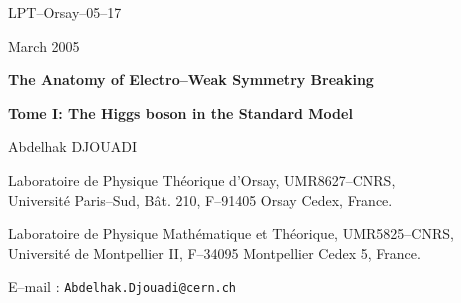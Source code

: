 \documentclass[12pt]{article}
\def\red{\color{Red}}
\def\blue{\color{Blue}}
\begin{document}
\newcommand{\lsim}{\raisebox{-0.13cm}{~\shortstack{$<$ \\[-0.07cm] $\sim$}}~}
\newcommand{\gsim}{\raisebox{-0.13cm}{~\shortstack{$>$ \\[-0.07cm] $\sim$}}~}
\newcommand{\dx}{\mbox{\rm d}}
\newcommand{\ra}{\rightarrow}
\newcommand{\lra}{\longrightarrow}
\newcommand{\ee}{e^+e^-}
\newcommand{\gam}{\gamma \gamma}
\newcommand{\tb}{\tan \beta}
\newcommand{\s}{\smallskip}
\newcommand{\nn}{\noindent}
\newcommand{\non}{\nonumber}
\newcommand{\beq}{\begin{eqnarray}}
\newcommand{\eeq}{\end{eqnarray}}
\newcommand{\pslash}{\not\hspace*{-1.6mm}p}
\newcommand{\kslash}{\not\hspace*{-1.6mm}k}
\newcommand{\lslash}{\not\hspace*{-1.6mm}l}
\newcommand{\eslash}{\hspace*{-1.4mm}\not\hspace*{-1.6mm}E}
\newcommand{\bb}{\blue{\large $\bullet$}}
\newcommand{\rb}{\red{\large $\bullet$}}
\newcommand{\bH}{\blue{$H$}}
\newcommand{\ib}{{\it ibid.\ }}
%
\baselineskip=17pt
\thispagestyle{empty}

\hfill LPT--Orsay--05--17

\hfill March 2005

\vspace*{.5cm}

\begin{center}


{\sc\Large\bf The Anatomy of Electro--Weak Symmetry Breaking}

\vspace{0.5cm}

{\large\sc\bf Tome I: The Higgs boson in the Standard Model}

\vspace{0.7cm}

{\sc\large Abdelhak DJOUADI} 
\vspace*{7mm} 

Laboratoire de Physique Th\'eorique d'Orsay, UMR8627--CNRS,\\
Universit\'e Paris--Sud, B\^at. 210, F--91405 Orsay Cedex, France. 
\vspace*{2mm}


Laboratoire de Physique Math\'ematique et Th\'eorique, UMR5825--CNRS,\\
Universit\'e de Montpellier II, F--34095 Montpellier Cedex 5, France. 
\vspace*{2mm}

E--mail : {\tt Abdelhak.Djouadi@cern.ch}

\vspace*{2mm}

\end{center} 
\end{document}
